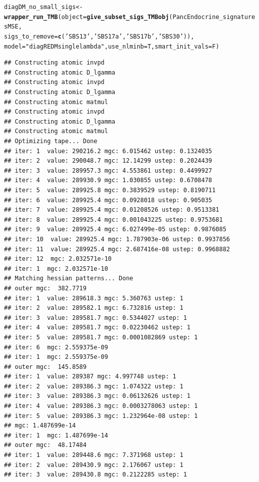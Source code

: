 \documentclass{article}\usepackage[]{graphicx}\usepackage[]{xcolor}
\makeatletter
\newcommand{\hlstr}[1]{\textcolor[rgb]{0.192,0.494,0.8}{#1}}%
\newcommand{\hlstd}[1]{\textcolor[rgb]{0.345,0.345,0.345}{#1}}%
\newcommand{\hlkwb}[1]{\textcolor[rgb]{0.69,0.353,0.396}{#1}}%
\newcommand{\hlkwc}[1]{\textcolor[rgb]{0.333,0.667,0.333}{#1}}%
\newcommand{\hlkwd}[1]{\textcolor[rgb]{0.737,0.353,0.396}{\textbf{#1}}}%
\newenvironment{kframe}{%
 \def\at@end@of@kframe{}%
 \ifinner\ifhmode%
  \def\at@end@of@kframe{\end{minipage}}%
  \begin{minipage}{\columnwidth}%
 \fi\fi%
 \def\FrameCommand##1{\hskip\@totalleftmargin \hskip-\fboxsep
 \colorbox{shadecolor}{##1}\hskip-\fboxsep
     \hskip-\linewidth \hskip-\@totalleftmargin \hskip\columnwidth}%
 \MakeFramed {\advance\hsize-\width
   \@totalleftmargin\z@ \linewidth\hsize
   \@setminipage}}%
 {\par\unskip\endMakeFramed%
 \at@end@of@kframe}
\newenvironment{knitrout}{}{} %
\makeatother
\begin{document}
\begin{knitrout}
\begin{kframe}
\begin{alltt}
\hlstd{diagDM_no_small_sigs} \hlkwb{<-} \hlkwd{wrapper_run_TMB}\hlstd{(}\hlkwc{object} \hlstd{=} \hlkwd{give_subset_sigs_TMBobj}\hlstd{(PancEndocrine_signaturesMSE,}
                                                                         \hlkwc{sigs_to_remove} \hlstd{=} \hlkwd{c}\hlstd{(}\hlstr{'SBS13'}\hlstd{,} \hlstr{'SBS17a'}\hlstd{,} \hlstr{'SBS17b'}\hlstd{,} \hlstr{'SBS30'}\hlstd{)),}
                                        \hlkwc{model} \hlstd{=} \hlstr{"diagREDMsinglelambda"}\hlstd{,} \hlkwc{use_nlminb}\hlstd{=T,} \hlkwc{smart_init_vals}\hlstd{=F)}
\end{alltt}
\begin{verbatim}
## Constructing atomic invpd
## Constructing atomic D_lgamma
## Constructing atomic invpd
## Constructing atomic D_lgamma
## Constructing atomic matmul
## Constructing atomic invpd
## Constructing atomic D_lgamma
## Constructing atomic matmul
## Optimizing tape... Done
## iter: 1  value: 290216.2 mgc: 6.015462 ustep: 0.1324035 
## iter: 2  value: 290048.7 mgc: 12.14299 ustep: 0.2024439 
## iter: 3  value: 289957.3 mgc: 4.553861 ustep: 0.4499927 
## iter: 4  value: 289930.9 mgc: 1.030855 ustep: 0.6708478 
## iter: 5  value: 289925.8 mgc: 0.3839529 ustep: 0.8190711 
## iter: 6  value: 289925.4 mgc: 0.0928018 ustep: 0.905035 
## iter: 7  value: 289925.4 mgc: 0.01208526 ustep: 0.9513381 
## iter: 8  value: 289925.4 mgc: 0.001043225 ustep: 0.9753681 
## iter: 9  value: 289925.4 mgc: 6.027499e-05 ustep: 0.9876085 
## iter: 10  value: 289925.4 mgc: 1.787903e-06 ustep: 0.9937856 
## iter: 11  value: 289925.4 mgc: 2.687416e-08 ustep: 0.9968882 
## iter: 12  mgc: 2.032571e-10 
## iter: 1  mgc: 2.032571e-10 
## Matching hessian patterns... Done
## outer mgc:  382.7719 
## iter: 1  value: 289618.3 mgc: 5.360763 ustep: 1 
## iter: 2  value: 289582.1 mgc: 6.732816 ustep: 1 
## iter: 3  value: 289581.7 mgc: 0.5344027 ustep: 1 
## iter: 4  value: 289581.7 mgc: 0.02230462 ustep: 1 
## iter: 5  value: 289581.7 mgc: 0.0001082869 ustep: 1 
## iter: 6  mgc: 2.559375e-09 
## iter: 1  mgc: 2.559375e-09 
## outer mgc:  145.8589 
## iter: 1  value: 289387 mgc: 4.997748 ustep: 1 
## iter: 2  value: 289386.3 mgc: 1.074322 ustep: 1 
## iter: 3  value: 289386.3 mgc: 0.06132626 ustep: 1 
## iter: 4  value: 289386.3 mgc: 0.0003278063 ustep: 1 
## iter: 5  value: 289386.3 mgc: 1.232964e-08 ustep: 1 
## mgc: 1.487699e-14 
## iter: 1  mgc: 1.487699e-14 
## outer mgc:  48.17484 
## iter: 1  value: 289448.6 mgc: 7.371968 ustep: 1 
## iter: 2  value: 289430.9 mgc: 2.176067 ustep: 1 
## iter: 3  value: 289430.8 mgc: 0.2122285 ustep: 1 

\end{verbatim}
\end{kframe}
\end{knitrout}
\end{document}
